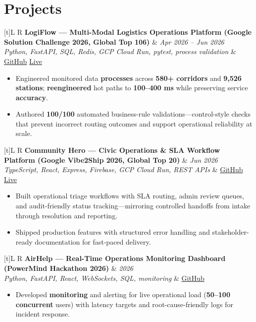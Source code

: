 \documentclass[a4paper,10pt]{article}
\newcommand{\resumeProject}[4]{%
  \vspace{0.5mm}
  \noindent
  \begin{tabularx}{\textwidth}[t]{L R}
    \textbf{#1} & \textit{#3} \\
    \textit{#2} & #4 \\
  \end{tabularx}
  \vspace{-0.5mm}%
}
\begin{document}
\section{Projects}
\small

\resumeProject
  {LogiFlow --- Multi-Modal Logistics Operations Platform (Google Solution Challenge 2026, Global Top 106)}
  {Python, FastAPI, SQL, Redis, GCP Cloud Run, pytest, process validation}
  {Apr 2026 -- Jun 2026}
  {\href{https://github.com/Ojas-Srivastava05/LogiFlow-Solution-Challenge-2026}{GitHub} \textbar{} \href{https://logi-flow-solution-challenge-2026.vercel.app/}{Live}}
\begin{itemize}
  \item Engineered monitored data \textbf{processes} across \textbf{580+ corridors} and \textbf{9,526 stations}; \textbf{reengineered} hot paths to \textbf{100--400 ms} while preserving service \textbf{accuracy}.
  \item Authored \textbf{100/100} automated business-rule validations---control-style checks that prevent incorrect routing outcomes and support operational reliability at scale.
\end{itemize}

\resumeProject
  {Community Hero --- Civic Operations \& SLA Workflow Platform (Google Vibe2Ship 2026, Global Top 20)}
  {TypeScript, React, Express, Firebase, GCP Cloud Run, REST APIs}
  {Jun 2026}
  {\href{https://github.com/Ojas-Srivastava05/community-hero}{GitHub} \textbar{} \href{https://community-hero-987477089222.asia-south1.run.app}{Live}}
\begin{itemize}
  \item Built operational triage workflows with SLA routing, admin review queues, and audit-friendly status tracking---mirroring controlled handoffs from intake through resolution and reporting.
  \item Shipped production features with structured error handling and stakeholder-ready documentation for fast-paced delivery.
\end{itemize}

\resumeProject
  {AirHelp --- Real-Time Operations Monitoring Dashboard (PowerMind Hackathon 2026)}
  {Python, FastAPI, React, WebSockets, SQL, monitoring}
  {2026}
  {\href{https://github.com/Ojas-Srivastava05/AirHelp-AI-Airport-Assistant}{GitHub}}
\begin{itemize}
  \item Developed \textbf{monitoring} and alerting for live operational load (\textbf{50--100 concurrent} users) with latency targets and root-cause-friendly logs for incident response.
\end{itemize}
\end{document}
